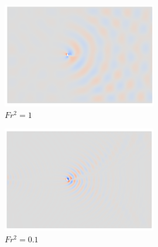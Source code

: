 \begin{figure}
    \begin{subfigure}[b]{0.32\textwidth}
        \centering
        \includegraphics[width=\textwidth]{images/spinning_ellipse/ar0p5fr1.png}
        \caption{$Fr^2 = 1$}
        \label{fig:ar0p5fr1}
    \end{subfigure}
    \hfill
    \begin{subfigure}[b]{0.32\textwidth}
        \centering
        \includegraphics[width=\textwidth]{images/spinning_ellipse/ar0p5fr0p3.png}
        \caption{$Fr^2 = 0.1$}
        \label{fig:ar0p5fr0p3}
    \end{subfigure}
    \hfill
    \begin{subfigure}[b]{0.32\textwidth}
        \centering

\end{subfigure}
\end{figure}
